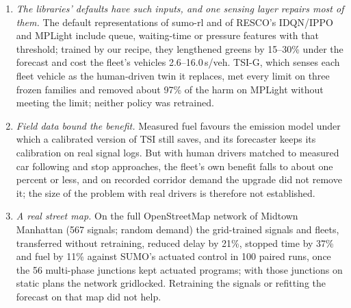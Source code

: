 \begin{enumerate}
change; with the halting count the harm persisted under a threshold-free delay reward (about half as large) and with the hand-picked scale
constants halved or doubled. TSI's light side is therefore a retrofit for signals with stop-thresholded inputs, not a property of learned
signals in general.
\item \emph{The libraries' defaults have such inputs, and one sensing layer repairs most of them.} The default representations of sumo-rl
and of RESCO's IDQN/IPPO and MPLight include queue, waiting-time or pressure features with that threshold; trained by our recipe, they
lengthened greens by 15--30\% under the forecast and cost the fleet's vehicles 2.6--16.0\,s/veh. TSI-G, which senses each fleet vehicle
as the human-driven twin it replaces, met every limit on three frozen families and removed about 97\% of the harm on MPLight without
meeting the limit; neither policy was retrained.
\item \emph{Field data bound the benefit.} Measured fuel favours the emission model under which a calibrated version of TSI still saves, and
its forecaster keeps its calibration on real signal logs. But with human drivers matched to measured car following and stop approaches, the
fleet's own benefit falls to about one percent or less, and on recorded corridor demand the upgrade did not remove it; the size of the
problem with real drivers is therefore not established.
\item \emph{A real street map.} On the full OpenStreetMap network of Midtown Manhattan (567 signals; random demand) the grid-trained
signals and fleets, transferred without retraining, reduced delay by 21\%, stopped time by 37\% and fuel by 11\% against SUMO's actuated
control in 100 paired runs, once the 56 multi-phase junctions kept actuated programs; with those junctions on static plans the network
gridlocked. Retraining the signals or refitting the forecast on that map did not help.
\end{enumerate}

